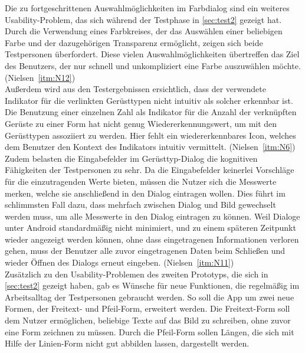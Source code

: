Die zu fortgeschrittenen Auswahlmöglichkeiten im Farbdialog sind ein weiteres Usability-Problem, das sich während der Testphase in \autoref{sec:test2} gezeigt hat.
Durch die Verwendung eines Farbkreises, der das Auswählen einer beliebigen Farbe und der dazugehörigen Transparenz ermöglicht, zeigen sich beide Testpersonen überfordert.
Diese vielen Auswahlmöglichkeiten übertreffen das Ziel des Benutzers, der nur schnell und unkompliziert eine Farbe auszuwählen möchte.
(Nielsen~\autoref{itm:N12}) \\

Außerdem wird aus den Testergebnissen ersichtlich, dass der verwendete Indikator für die verlinkten Gerüsttypen nicht intuitiv als solcher erkennbar ist.
Die Benutzung einer einzelnen Zahl als Indikator für die Anzahl der verknüpften Gerüste zu einer Form hat nicht genug Wiedererkennungswert, um mit den Gerüsttypen assoziiert zu werden.
Hier fehlt ein wiedererkennbares Icon, welches dem Benutzer den Kontext des Indikators intuitiv vermittelt.
(Nielsen~\autoref{itm:N6}) \\

Zudem belasten die Eingabefelder im Gerüsttyp-Dialog die kognitiven Fähigkeiten der Testpersonen zu sehr.
Da die Eingabefelder keinerlei Vorschläge für die einzutragenden Werte bieten, müssen die Nutzer sich die Messwerte merken, welche sie anschließend in den Dialog eintragen wollen.
Dies führt im schlimmsten Fall dazu, dass mehrfach zwischen Dialog und Bild gewechselt werden muss, um alle Messwerte in den Dialog eintragen zu können.
Weil Dialoge unter Android standardmäßig nicht minimiert, und zu einem späteren Zeitpunkt wieder angezeigt werden können, ohne dass eingetragenen Informationen verloren gehen, muss der Benutzer alle zuvor eingetragenen Daten beim Schließen und wieder Öffnen des Dialogs erneut eingeben.
(Nielsen~\autoref{itm:N11}) \\

Zusätzlich zu den Usability-Problemen des zweiten Prototyps, die sich in \autoref{sec:test2} gezeigt haben, gab es Wünsche für neue Funktionen, die regelmäßig im Arbeitsalltag der Testpersonen gebraucht werden.
So soll die App um zwei neue Formen, der Freitext- und Pfeil-Form, erweitert werden.
Die Freitext-Form soll dem Nutzer ermöglichen, beliebige Texte auf das Bild zu schreiben, ohne zuvor eine Form zeichnen zu müssen. 
Durch die Pfeil-Form sollen Längen, die sich mit Hilfe der Linien-Form nicht gut abbilden lassen, dargestellt werden. \\

